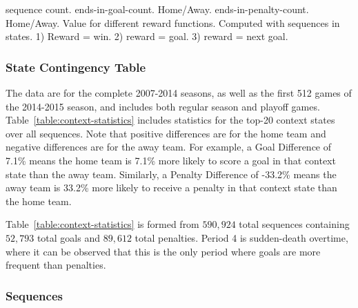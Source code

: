 \documentclass[]{article}
\begin{document}
sequence count.
ends-in-goal-count. Home/Away.
ends-in-penalty-count. Home/Away.
Value for different reward functions. Computed with sequences in states.
1) Reward = win. 2) reward = goal. 3) reward = next goal.

\subsubsection{State Contingency Table}

The data are for the complete 2007-2014 seasons, as well as the first 512 games of the 2014-2015 season, and includes both regular season and playoff games. Table~\ref{table:context-statistics} includes statistics for the top-20 context states over all sequences. Note that positive differences are for the home team and negative differences are for the away team. For example, a Goal Difference of 7.1\% means the home team is 7.1\% more likely to score a goal in that context state than the away team. Similarly, a Penalty Difference of -33.2\% means the away team is 33.2\% more likely to receive a penalty in that context state than the home team.

Table~\ref{table:context-statistics} is formed from $590,924$ total sequences containing $52,793$ total goals and $89,612$ total penalties. Period 4 is sudden-death overtime, where it can be observed that this is the only period where goals are more frequent than penalties.

\subsubsection{Sequences}

\begin{table}[htb]
\caption{Event Sequence Statistics}
\label{table:event-sequence-statistics}
\begin{center}
\end{center}
\end{table}
\end{document}
